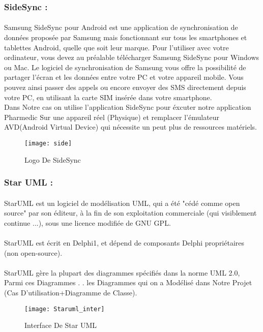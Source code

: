 \documentclass[12pt, openany]{report}
\begin{document}
\subsubsection{\large SideSync :}
\paragraph{}Samsung SideSync pour Android est une application de synchronisation de données proposée par Samsung mais fonctionnant sur tous les smartphones et tablettes Android, quelle que soit leur marque. Pour l'utiliser avec votre ordinateur, vous devez au préalable télécharger Samsung SideSync pour Windows ou Mac. Le logiciel de synchronisation de Samsung vous offre la possibilité de partager l'écran et les données entre votre PC et votre appareil mobile. Vous pouvez ainsi passer des appels ou encore envoyer des SMS directement depuis votre PC, en utilisant la carte SIM insérée dans votre smartphone.
\\ Dans Notre cas on utilise l'application SideSync pour éxcuter notre application Pharmedic Sur une appareil réel (Physique) et remplacer l'émulateur AVD(Android Virtual Device) qui nécessite un peut plus de ressources matériels.
\begin{figure}[!h]
	\centering
	\texttt{[image: side]}
	\caption{Logo De SideSync}
	\label{fig:side}
\end{figure}
\subsubsection{ \large Star UML :}
\paragraph{}StarUML est un logiciel de modélisation UML, qui a été "cédé comme open source" par son éditeur, à la fin de son exploitation commerciale (qui visiblement continue ...), sous une licence modifiée de GNU GPL.
\paragraph{}StarUML est écrit en Delphi1, et dépend de composants Delphi propriétaires (non open-source).
\paragraph{}StarUML gère la plupart des diagrammes spécifiés dans la norme UML 2.0, Parmi ces Diagrammes . . les Diagrammes qui on a Modélisé dans Notre Projet (Cas D'utilisation+Diagramme de Classe).
\begin{figure}[!h]
	\centering
	\texttt{[image: Staruml\_inter]}
	\caption{Interface De Star UML}
	\label{fig:starumllogo}
\end{figure}
\end{document}
